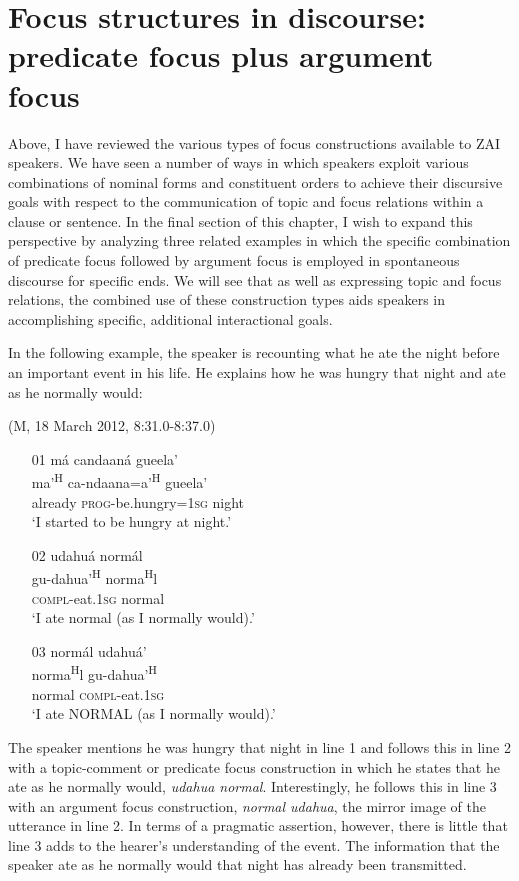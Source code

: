 \section{Focus structures in discourse: predicate focus plus argument focus}\label{chiasmus}

Above, I have reviewed the various types of focus constructions available to ZAI speakers. We have seen a number of ways in which speakers exploit various combinations of nominal forms and constituent orders to achieve their discursive goals with respect to the communication of topic and focus relations within a clause or sentence. In the final section of this chapter, I wish to expand this perspective by analyzing three related examples in which the specific combination of predicate focus followed by argument focus is employed in spontaneous discourse for specific ends. We will see that as well as expressing topic and focus relations, the combined use of these construction types aids speakers in accomplishing specific, additional interactional goals. 

In the following example, the speaker is recounting what he ate the night before an important event in his life. He explains how he was hungry that night and ate as he normally would:

\ea (M, 18 March 2012, 8:31.0-8:37.0)
\begin{itemize}

\item[01] 
\glll m\'{a} candaan\'{a} gueela'  \\
ma'\textsuperscript{H} ca-ndaana=a'\textsuperscript{H} gueela'  \\
already \textsc{prog}-be.hungry=\textsc{1sg} night  \\
\glt `I started to be hungry at night.'



\item[02] 
\glll udahu\'{a} norm\'{a}l  \\
 gu-dahua'\textsuperscript{H} norma\textsuperscript{H}l  \\
\textsc{compl}-eat.\textsc{1sg} normal  \\
\glt `I ate normal (as I normally would).'


\item[03] 
\glll norm\'{a}l udahu\'{a}'  \\
norma\textsuperscript{H}l gu-dahua'\textsuperscript{H}  \\
normal \textsc{compl}-eat.\textsc{1sg}  \\
\glt `I ate NORMAL (as I normally would).'

\end{itemize}
\z
The speaker mentions he was hungry that night in line 1 and follows this in line 2 with a topic-comment or predicate focus construction in which he states that he ate as he normally would, \textit{udahua normal}. Interestingly, he follows this in line 3 with an argument focus construction, \textit{normal udahua}, the mirror image of the utterance in line 2. In terms of a pragmatic assertion, however, there is little that line 3 adds to the hearer's understanding of the event. The information that the speaker ate as he normally would that night has already been transmitted. 

